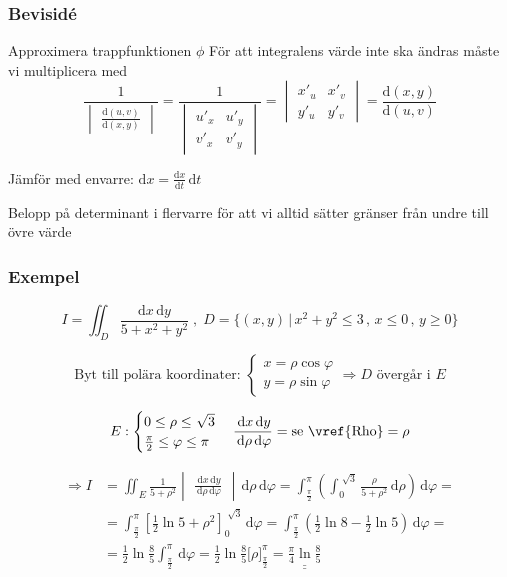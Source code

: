 \documentclass[a4paper]{article}
\newcommand{\svar}[1]{\underline{\underline{#1}}}
\let\oldsqrt\sqrt
\renewcommand*{\sqrt}[2][\ ]{\oldsqrt[#1]{#2} }
\begin{document}
\subsubsection{Bevisidé}
Approximera trappfunktionen $\phi$ \newline
För att integralens värde inte ska ändras måste vi multiplicera med
$$
	\frac{1}{
	\begin{vmatrix}
		\frac{\mathrm{d}(u,v)}{\mathrm{d}(x,y)}
	\end{vmatrix}}
	= \frac{1}{
	\begin{vmatrix}
		u'_x & u'_y \\
		v'_x & v'_y
	\end{vmatrix}}
	=
	\begin{vmatrix}
		x'_u & x'_v \\
		y'_u & y'_v
	\end{vmatrix}
	= \frac{\mathrm{d}(x,y)}{\mathrm{d}(u,v)}
$$

Jämför med envarre: $\mathrm{d}x = \frac{\mathrm{d}x}{\mathrm{d}t}\,\mathrm{d}t$ \newline

Belopp på determinant i flervarre för att vi alltid sätter gränser från undre till övre värde

\subsubsection{Exempel}

$$I = \iint_D \frac{\mathrm{d}x\,\mathrm{d}y}{5+x^2+y^2} \; , \; D=\Big\{(x,y) \, | \, x^2+y^2 \leq 3 \,,\, x \leq 0 \,,\, y \geq 0\Big\}$$

$$\text{Byt till polära koordinater: } \left\{
\begin{array}{rcl}
	x = \rho\cos{\varphi} \\
	y = \rho\sin{\varphi}
\end{array}\right.
\Rightarrow D\text{ övergår i } E$$

$$E:
\begin{cases}
	0 \leq \rho \leq \sqrt{3} \\
	\frac{\pi}{2} \leq \varphi \leq \pi
\end{cases}
\frac{\,\mathrm{d}x\,\mathrm{d}y}{\,\mathrm{d}\rho\,\mathrm{d}\varphi} = \text{se \vref{Rho}} = \rho $$

\begin{align*}
\Rightarrow I &= \iint_E \frac{1}{5+\rho^2}
\begin{vmatrix}
	\frac{\,\mathrm{d}x\,\mathrm{d}y}{\,\mathrm{d}\rho\,\mathrm{d}\varphi}
\end{vmatrix}
\,\mathrm{d}\rho\,\mathrm{d}\varphi = \int_\frac{\pi}{2}^\pi \left( \int_0^{\sqrt{3}} \frac{\rho}{5+\rho^2} \,\mathrm{d}\rho \right)\,\mathrm{d}\varphi = \\
&= \int_\frac{\pi}{2}^\pi \left[ \frac{1}{2} \ln{5+\rho^2} \right]_0^{\sqrt{3}} \,\mathrm{d}\varphi = \int_\frac{\pi}{2}^\pi \left( \frac{1}{2} \ln{8} - \frac{1}{2} \ln{5} \right) \,\mathrm{d}\varphi = \\
&= \frac{1}{2} \ln{\frac{8}{5}} \int_\frac{\pi}{2}^\pi \,\mathrm{d}\varphi = \frac{1}{2}\ln{\frac{8}{5}} \Big[\rho\Big]_\frac{\pi}{2}^\pi = \svar{\frac{\pi}{4}\ln{\frac{8}{5}}}
\end{align*}
\end{document}
